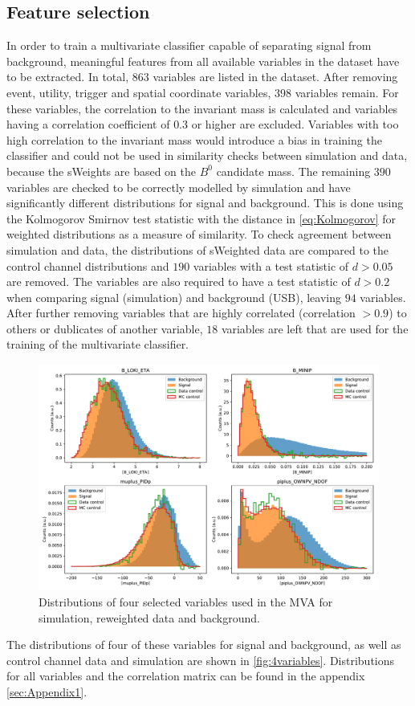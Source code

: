 \subsection{Feature selection}
In order to train a multivariate classifier capable of separating signal from background, meaningful features from all available variables in the dataset 
have to be extracted. In total, $\num{863}$ variables are listed in the dataset. After removing event, utility, trigger and spatial coordinate variables, $\num{398}$ variables remain.
For these variables, the correlation to the invariant mass is calculated and variables having a correlation coefficient of $\num{0.3}$ or higher are excluded.
Variables with too high correlation to the invariant mass would introduce a bias in training the classifier and could not be used in similarity checks between simulation and data,
because the sWeights are based on the $B^0$ candidate mass. The remaining $\num{390}$ variables are checked to be correctly modelled by simulation and have significantly different 
distributions for signal and background. This is done using the Kolmogorov Smirnov test statistic with the distance in \autoref{eq:Kolmogorov} for weighted distributions as a measure of similarity. 
To check agreement between simulation and data, the distributions of sWeighted data are compared to the control channel distributions and $\num{190}$ variables with a test statistic 
of $d > \num{0.05}$ are removed. The variables are also required to have a test statistic of $d > \num{0.2}$ when comparing signal (simulation) and background (USB), leaving 
$\num{94}$ variables. After further removing variables that are highly correlated (correlation $> 0.9$) to others or dublicates of another variable, $\num{18}$ variables are 
left that are used for the training of the multivariate classifier.
\begin{figure}
  \centering
  \includegraphics[width = .9\textwidth]{"content/plots/4variables.pdf"}
  \caption{Distributions of four selected variables used in the MVA for simulation, reweighted data and background.}
  \label{fig:4variables}
\end{figure}
The distributions of four of these variables for signal and background, as well as control channel data and simulation are shown in \autoref{fig:4variables}. Distributions for all
variables and the correlation matrix can be found in the appendix \ref{sec:Appendix1}.

